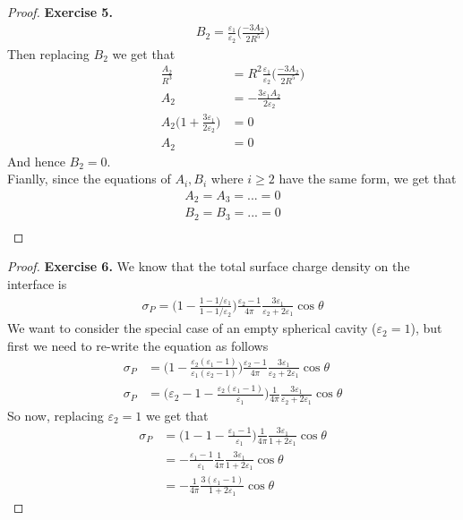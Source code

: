 \documentclass[11pt]{article}
\newcommand{\varep}{\varepsilon}
\theoremstyle{definition}
\begin{document}
\begin{proof}{\textbf{Exercise 5.}}
\begin{align*}
    B_2 = \frac{\varepsilon_1}{\varepsilon_2}\bigg(\frac{-3A_2}{2R^5}\bigg)
\end{align*}
Then replacing $B_2$ we get that
\begin{align*}
    \frac{A_2}{R^3}
    &= R^2\frac{\varepsilon_1}{\varepsilon_2}\bigg(\frac{-3A_2}{2R^5}\bigg)\\
    A_2 &= -\frac{3\varepsilon_1A_2}{2\varepsilon_2}\\
    A_2\bigg( 1 + \frac{3\varepsilon_1}{2\varepsilon_2}\bigg) &= 0\\
    A_2 &= 0
\end{align*}
And hence $B_2 = 0$.
\\
Fianlly, since the equations of $A_i, B_i$ where $i \geq 2$ have the same form,
we get that
\begin{align*}
    A_2 = A_3 = ... = 0\\
    B_2 = B_3 = ... = 0\\
\end{align*}
\end{proof}

\cleardoublepage
\begin{proof}{\textbf{Exercise 6.}}
We know that the total surface charge density on the interface is
\begin{align*}
    \sigma_P = \bigg(1 - \frac{1 - 1/\varepsilon_1}{1 - 1/\varepsilon_2}\bigg)
    \frac{\varepsilon_2 - 1}{4\pi}
    \frac{3\varepsilon_1}{\varepsilon_2 + 2\varepsilon_1}\cos\theta
\end{align*}
We want to consider the special case of an empty spherical cavity
($\varepsilon_2 = 1$), but first we need to re-write the equation as follows
\begin{align*}
    \sigma_P &=\bigg(1 - \frac{\varep_2(\varep_1 - 1)}{\varep_1(\varep_2 - 1)}\bigg)
    \frac{\varepsilon_2 - 1}{4\pi}
    \frac{3\varepsilon_1}{\varepsilon_2 + 2\varepsilon_1}\cos\theta\\
    \sigma_P &=\bigg(
    \varep_2 - 1 - \frac{\varep_2(\varep_1 - 1)}{\varep_1}\bigg)
    \frac{1}{4\pi}
    \frac{3\varepsilon_1}{\varepsilon_2 + 2\varepsilon_1}\cos\theta
\end{align*}
So now, replacing $\varep_2 = 1$ we get that
\begin{align*}
    \sigma_P &= \bigg(
    1 - 1 - \frac{\varep_1 - 1}{\varep_1}\bigg)
    \frac{1}{4\pi}
    \frac{3\varepsilon_1}{1 + 2\varepsilon_1}\cos\theta\\
    &= - \frac{\varep_1 - 1}{\varep_1}\frac{1}{4\pi}
    \frac{3\varepsilon_1}{1 + 2\varepsilon_1}\cos\theta\\
    &= - \frac{1}{4\pi}
    \frac{3(\varep_1 - 1)}{1 + 2\varepsilon_1}\cos\theta
\end{align*}
\end{proof}
\end{document}
